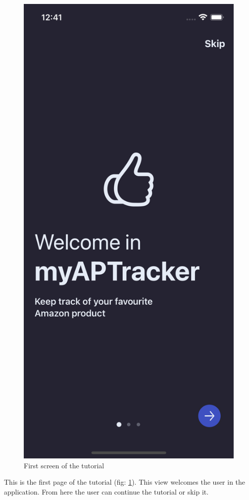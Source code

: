 \begin{figure}[h!]
        \centering
        \includegraphics[scale=0.15]{images/interfaces/tutorial_screen_1.png}
        \caption{First screen of the tutorial}
        \label{fig:tutorial_screen_1}
\end{figure}
\FloatBarrier
This is the first page of the tutorial (fig: \ref{fig:tutorial_screen_1}). This view welcomes the user in the application. From here the user can continue the tutorial or skip it.

